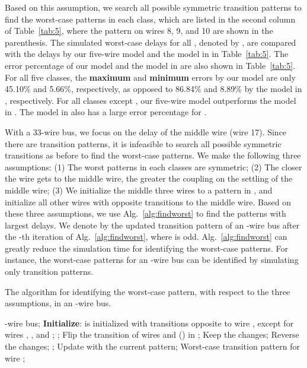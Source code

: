 \documentclass[10pt,journal]{IEEEtran}
\begin{document}
Based on this assumption, we search all possible symmetric transition patterns to find the worst-case patterns in each class, which
are listed in the second column of Table~\ref{tab:5}, where the pattern on wires 8, 9, and 10 are shown in the parenthesis. The simulated worst-case delays for all , denoted by , are compared with the delays by our five-wire model and the model in \cite{Sot01} in Table~\ref{tab:5}. The error percentage of our model and the model in \cite{Sot01}  are also shown in Table~\ref{tab:5}. For all five classes, the \textbf{maximum} and \textbf{minimum} errors by our model are only 45.10\% and 5.66\%, respectively, as opposed to 86.84\% and 8.89\% by the model in \cite{Sot01}, respectively. For all classes except , our five-wire model outperforms the model in \cite{Sot01}. The model in \cite{Sot01} also has a large error percentage for .




With a 33-wire bus, we focus on the delay of the middle wire (wire 17). Since there are  transition patterns, it is infeasible to search all possible symmetric transitions as before to find the worst-case patterns. We make the following three assumptions: (1) The worst patterns in each classes are symmetric; (2) The closer the wire gets to the middle wire, the greater the coupling on the settling of the middle wire; (3) We initialize the middle three wires to a pattern in , and initialize all other wires with opposite transitions to the middle wire. Based on these three assumptions, we use Alg.~\ref{alg:findworst} to find the patterns with largest delays. We denote by  the updated transition pattern of an -wire bus after the -th iteration of Alg.~\ref{alg:findworst}, where  is odd. Alg.~\ref{alg:findworst} can greatly reduce the simulation time for identifying the worst-case patterns. For instance, the worst-case patterns for an -wire bus can be identified by simulating only  transition patterns.


\begin{algorithm}[!tp]
  \caption{The algorithm for identifying the worst-case pattern, with respect to the three assumptions, in an -wire bus.}
  \begin{algorithmic}
    \REQUIRE -wire bus;
    \STATE \textbf{Initialize}:  is initialized with transitions opposite to wire , except for wires , , and ;
    \STATE ;
    \REPEAT
    \STATE Flip the transition of wires  and () in ;
    \STATE Keep the changes;
    \ELSE
    \STATE Reverse the changes;
    \ENDIF
    \ENDFOR
    \STATE ;
    \STATE Update  with the current pattern;
    \UNTIL{}
    \RETURN Worst-case transition pattern for wire ;
  \end{algorithmic}
  \label{alg:findworst}
\end{algorithm}
\end{document}
